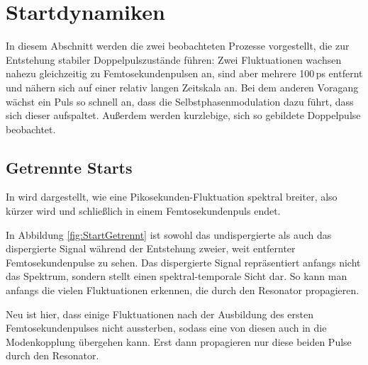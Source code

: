 \documentclass[bachelor,       %
               twoside,        %
               BCOR10mm,       %
               liststotoc,nomtotoc,bibtotoc, %
               english,ngerman, %
               final,          %
               ]{GAUBM}
\begin{document}
\clearpage

\section{Startdynamiken}
\label{sec:start}
In diesem Abschnitt werden die zwei beobachteten Prozesse vorgestellt, die zur Entstehung stabiler Doppelpulszustände führen:
Zwei Fluktuationen wachsen nahezu gleichzeitig zu Femtosekundenpulsen an, sind aber mehrere 100\,ps entfernt und nähern sich auf einer relativ langen Zeitskala an.
Bei dem anderen Voragang wächst ein Puls so schnell an, dass die Selbstphasenmodulation dazu führt, dass sich dieser aufspaltet.
Außerdem werden kurzlebige, sich so gebildete Doppelpulse beobachtet.

\subsection{Getrennte Starts}
In \cite{herink_resolving_2016} wird dargestellt, wie eine Pikosekunden-Fluktuation  spektral breiter, also kürzer wird und schließlich in einem Femtosekundenpuls endet.

In Abbildung \ref{fig:StartGetrennt} ist sowohl das undispergierte als auch das dispergierte Signal während der Entstehung zweier, weit entfernter Femtosekundenpulse zu sehen.
Das dispergierte Signal repräsentiert anfangs nicht das Spektrum, sondern stellt einen spektral-temporale Sicht dar.
So kann man anfangs die vielen Fluktuationen erkennen, die durch den Resonator propagieren.

Neu ist hier, dass einige Fluktuationen nach der Ausbildung des ersten Femtosekundenpulses nicht aussterben, sodass eine von diesen auch in die Modenkopplung übergehen kann.
Erst dann propagieren nur diese beiden Pulse durch den Resonator.
\end{document}
